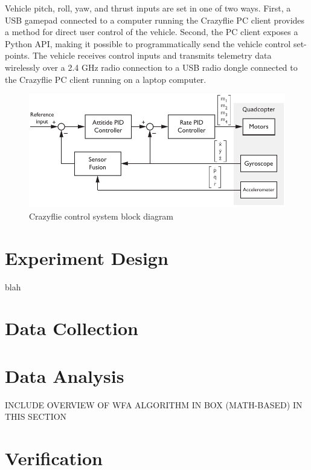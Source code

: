 Vehicle pitch, roll, yaw, and thrust inputs are set in one of two ways. First, a USB gamepad connected to a computer running the Crazyflie PC client provides a method for direct user control of the vehicle. Second, the PC client exposes a Python API, making it possible to programmatically send the vehicle control set-points. The vehicle receives control inputs and transmits telemetry data wirelessly over a 2.4 GHz radio connection to a USB radio dongle connected to the Crazyflie PC client running on a laptop computer.
\begin{figure}[htb!]
	\centering
	\includegraphics{../fig/crazyflie_control_system_block_diagram.pdf}
	\caption{Crazyflie control system block diagram}
\end{figure}

\section{Experiment Design}
blah

\section{Data Collection}



\section{Data Analysis}
INCLUDE OVERVIEW OF WFA ALGORITHM IN BOX (MATH-BASED) IN THIS SECTION


\section{Verification}